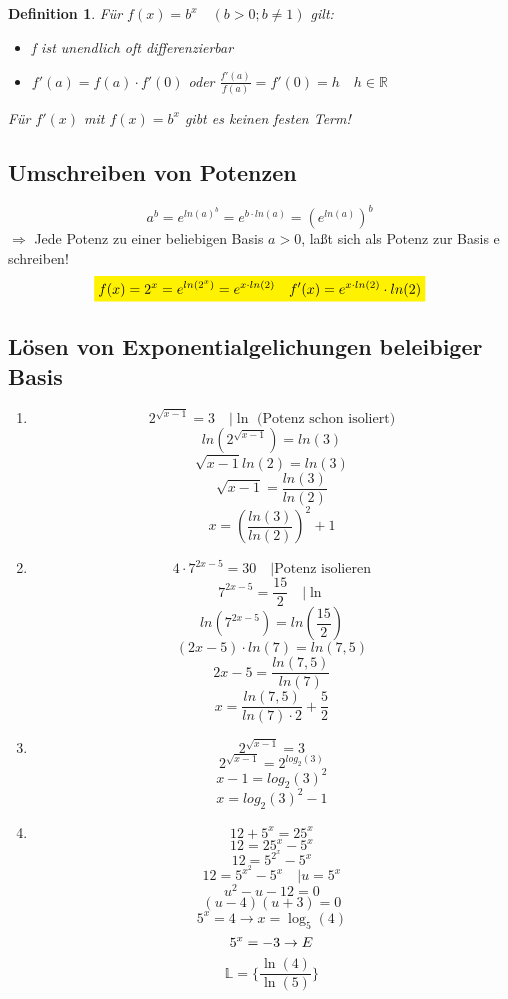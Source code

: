 \documentclass{scrbook}
\newcommand{\mathcolorbox}[2]{\colorbox{#1}{$\displaystyle #2$}}
\newtheorem{definition}{Definition}
\begin{document}
\begin{definition}
Für $f(x) = b^x \quad (b > 0 ; b \not = 1)$ gilt:
\begin {itemize}
\item f ist unendlich oft differenzierbar
\item $f'(a) =f(a) \cdot f'(0) $ oder $\frac {f'(a)}{f(a)} = f'(0) = h \quad h \in \mathbb{R}$
\end{itemize}

Für $f'(x)$ mit $f(x) = b^x$ gibt es keinen festen Term!
\end{definition}


\subsection{Umschreiben von Potenzen}

\[ a^b = e^{ln(a)^b} = e^{b \cdot ln(a)} = (e^{ln(a)})^b\]
$\Rightarrow$ Jede Potenz zu einer beliebigen Basis $a > 0$, laßt sich als Potenz zur Basis e schreiben!
\[ \mathcolorbox{yellow}{f(x) = 2^x = e^{ln(2^x)} = e^{x\cdot ln(2)} \quad f'(x) = e^{x \cdot ln(2)} \cdot ln(2)}\]

\subsection{Lösen von Exponentialgelichungen beleibiger Basis}
\begin{enumerate}
\item 
\[ 2^{\sqrt{x-1}}  = 3 \quad \vert \ln \text{ (Potenz schon isoliert)}\]
\[ln( 2^{\sqrt{x-1}}) = ln(3)\]
\[\sqrt{x-1}ln(2) = ln(3)\]
\[\sqrt{x-1} = \frac{ln(3)}{ln(2)}\]
\[x = (\frac{ln(3)}{ln(2)})^2 + 1\]

\item
\[4 \cdot  7^{2x-5} = 30 \quad \vert \text{Potenz isolieren}\]
\[7^{2x-5} = \frac {15}2 \quad \vert \ln \]
\[ln(7^{2x-5} ) = ln(\frac{15}2)\]
\[(2x-5)\cdot ln(7) = ln(7,5)\]
\[2x-5 = \frac{ln(7,5)}{ln(7)}\]
\[x = \frac{ln(7,5)}{ln(7)\cdot 2} + \frac 52\]

\item
\[2 ^{\sqrt{x-1}} = 3\]
\[2^{\sqrt{x-1}} = 2^{log_2(3)}\]
\[x-1 = log_2(3)^2\]
\[x = log_2(3)^2-1\]
\item
\[12+5^x = 25^x\]
\[12 = 25^x-5^x\]
\[12 = 5^{2^x} - 5^x\]
\[12 = 5^{x^2} - 5^x \quad \vert u = 5^x\]
\[u^2 - u - 12 = 0\]
\[(u-4)(u+3) = 0\]
\[5^x = 4 \rightarrow x = \log_5(4)\]
\[5^x = -3 \rightarrow \Lightning\]
\[ \mathbb{L} = \{ \frac{\ln(4)} {\ln(5)} \} \]

\end{enumerate}
\end{document}
